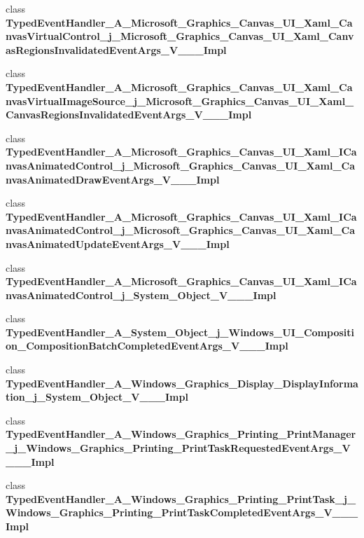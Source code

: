 \begin{DoxyCompactItemize}
\item 
class {\bfseries Typed\+Event\+Handler\+\_\+\+A\+\_\+\+Microsoft\+\_\+\+Graphics\+\_\+\+Canvas\+\_\+\+U\+I\+\_\+\+Xaml\+\_\+\+Canvas\+Virtual\+Control\+\_\+j\+\_\+\+Microsoft\+\_\+\+Graphics\+\_\+\+Canvas\+\_\+\+U\+I\+\_\+\+Xaml\+\_\+\+Canvas\+Regions\+Invalidated\+Event\+Args\+\_\+\+V\+\_\+\+\_\+\+\_\+\+Impl}
\item 
class {\bfseries Typed\+Event\+Handler\+\_\+\+A\+\_\+\+Microsoft\+\_\+\+Graphics\+\_\+\+Canvas\+\_\+\+U\+I\+\_\+\+Xaml\+\_\+\+Canvas\+Virtual\+Image\+Source\+\_\+j\+\_\+\+Microsoft\+\_\+\+Graphics\+\_\+\+Canvas\+\_\+\+U\+I\+\_\+\+Xaml\+\_\+\+Canvas\+Regions\+Invalidated\+Event\+Args\+\_\+\+V\+\_\+\+\_\+\+\_\+\+Impl}
\item 
class {\bfseries Typed\+Event\+Handler\+\_\+\+A\+\_\+\+Microsoft\+\_\+\+Graphics\+\_\+\+Canvas\+\_\+\+U\+I\+\_\+\+Xaml\+\_\+\+I\+Canvas\+Animated\+Control\+\_\+j\+\_\+\+Microsoft\+\_\+\+Graphics\+\_\+\+Canvas\+\_\+\+U\+I\+\_\+\+Xaml\+\_\+\+Canvas\+Animated\+Draw\+Event\+Args\+\_\+\+V\+\_\+\+\_\+\+\_\+\+Impl}
\item 
class {\bfseries Typed\+Event\+Handler\+\_\+\+A\+\_\+\+Microsoft\+\_\+\+Graphics\+\_\+\+Canvas\+\_\+\+U\+I\+\_\+\+Xaml\+\_\+\+I\+Canvas\+Animated\+Control\+\_\+j\+\_\+\+Microsoft\+\_\+\+Graphics\+\_\+\+Canvas\+\_\+\+U\+I\+\_\+\+Xaml\+\_\+\+Canvas\+Animated\+Update\+Event\+Args\+\_\+\+V\+\_\+\+\_\+\+\_\+\+Impl}
\item 
class {\bfseries Typed\+Event\+Handler\+\_\+\+A\+\_\+\+Microsoft\+\_\+\+Graphics\+\_\+\+Canvas\+\_\+\+U\+I\+\_\+\+Xaml\+\_\+\+I\+Canvas\+Animated\+Control\+\_\+j\+\_\+\+System\+\_\+\+Object\+\_\+\+V\+\_\+\+\_\+\+\_\+\+Impl}
\item 
class {\bfseries Typed\+Event\+Handler\+\_\+\+A\+\_\+\+System\+\_\+\+Object\+\_\+j\+\_\+\+Windows\+\_\+\+U\+I\+\_\+\+Composition\+\_\+\+Composition\+Batch\+Completed\+Event\+Args\+\_\+\+V\+\_\+\+\_\+\+\_\+\+Impl}
\item 
class {\bfseries Typed\+Event\+Handler\+\_\+\+A\+\_\+\+Windows\+\_\+\+Graphics\+\_\+\+Display\+\_\+\+Display\+Information\+\_\+j\+\_\+\+System\+\_\+\+Object\+\_\+\+V\+\_\+\+\_\+\+\_\+\+Impl}
\item 
class {\bfseries Typed\+Event\+Handler\+\_\+\+A\+\_\+\+Windows\+\_\+\+Graphics\+\_\+\+Printing\+\_\+\+Print\+Manager\+\_\+j\+\_\+\+Windows\+\_\+\+Graphics\+\_\+\+Printing\+\_\+\+Print\+Task\+Requested\+Event\+Args\+\_\+\+V\+\_\+\+\_\+\+\_\+\+Impl}
\item 
class {\bfseries Typed\+Event\+Handler\+\_\+\+A\+\_\+\+Windows\+\_\+\+Graphics\+\_\+\+Printing\+\_\+\+Print\+Task\+\_\+j\+\_\+\+Windows\+\_\+\+Graphics\+\_\+\+Printing\+\_\+\+Print\+Task\+Completed\+Event\+Args\+\_\+\+V\+\_\+\+\_\+\+\_\+\+Impl}

\end{DoxyCompactItemize}
